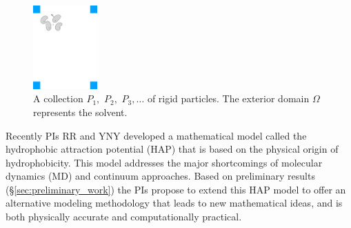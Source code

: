 \begin{figure}
\centerline{\includegraphics[width=0.22\textwidth]{figures/BG_fig1.pdf}}
\caption{ \footnotesize
A collection $P_1,$ $P_2,$ $P_3, \ldots$ of rigid particles. The
  exterior domain $\Omega$ represents the solvent.}
  \label{fig:domain}
\end{figure}
Recently PIs RR and YNY developed a mathematical model called the
hydrophobic attraction potential (HAP) \cite{Fu2018_SIAM} that is based
on the physical origin of hydrophobicity. This model addresses the major
shortcomings of molecular dynamics (MD) and continuum approaches. Based
on preliminary results (\S\ref{sec:preliminary_work}) the PIs propose to
extend this HAP model to offer an alternative modeling methodology that
leads to new mathematical ideas, and is both physically accurate and
computationally practical.
%
%
%
%
